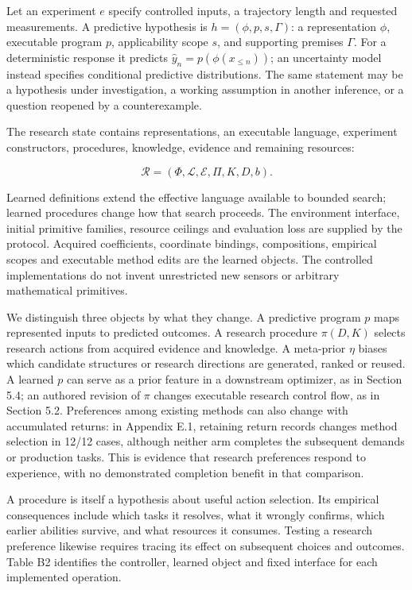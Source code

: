 \documentclass[twoside,11pt]{article}
\begin{document}
Let an experiment \(e\) specify controlled inputs, a trajectory length and requested measurements. A predictive hypothesis is \(h=(\phi,p,s,\Gamma)\): a representation \(\phi\), executable program \(p\), applicability scope \(s\), and supporting premises \(\Gamma\). For a deterministic response it predicts \(\hat y_n=p(\phi(x_{\leq n}))\); an uncertainty model instead specifies conditional predictive distributions. The same statement may be a hypothesis under investigation, a working assumption in another inference, or a question reopened by a counterexample.


The research state contains representations, an executable language, experiment constructors, procedures, knowledge, evidence and remaining resources:


\[
\mathcal R=(\Phi,\mathcal L,\mathcal E,\Pi,K,D,b).
\]


Learned definitions extend the effective language available to bounded search; learned procedures change how that search proceeds. The environment interface, initial primitive families, resource ceilings and evaluation loss are supplied by the protocol. Acquired coefficients, coordinate bindings, compositions, empirical scopes and executable method edits are the learned objects. The controlled implementations do not invent unrestricted new sensors or arbitrary mathematical primitives.


We distinguish three objects by what they change. A predictive program \(p\) maps represented inputs to predicted outcomes. A research procedure \(\pi(D,K)\) selects research actions from acquired evidence and knowledge. A meta-prior \(\eta\) biases which candidate structures or research directions are generated, ranked or reused. A learned \(p\) can serve as a prior feature in a downstream optimizer, as in Section 5.4; an authored revision of \(\pi\) changes executable research control flow, as in Section 5.2. Preferences among existing methods can also change with accumulated returns: in Appendix E.1, retaining return records changes method selection in 12/12 cases, although neither arm completes the subsequent demands or production tasks. This is evidence that research preferences respond to experience, with no demonstrated completion benefit in that comparison.


A procedure is itself a hypothesis about useful action selection. Its empirical consequences include which tasks it resolves, what it wrongly confirms, which earlier abilities survive, and what resources it consumes. Testing a research preference likewise requires tracing its effect on subsequent choices and outcomes. Table B2 identifies the controller, learned object and fixed interface for each implemented operation.
\end{document}
